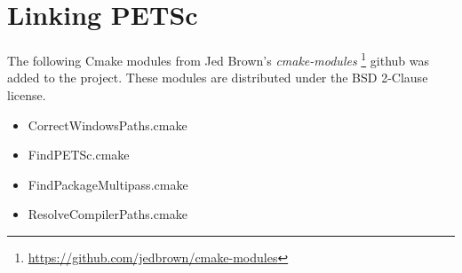 \chapter{Linking PETSc}

The following Cmake modules from Jed Brown's \emph{cmake-modules}
\footnote{\url{https://github.com/jedbrown/cmake-modules}}
github was added to the project. These modules are distributed under the BSD 2-Clause
license. 

\begin{itemize}
	\item CorrectWindowsPaths.cmake
	\item FindPETSc.cmake
	\item FindPackageMultipass.cmake
	\item ResolveCompilerPaths.cmake
\end{itemize}